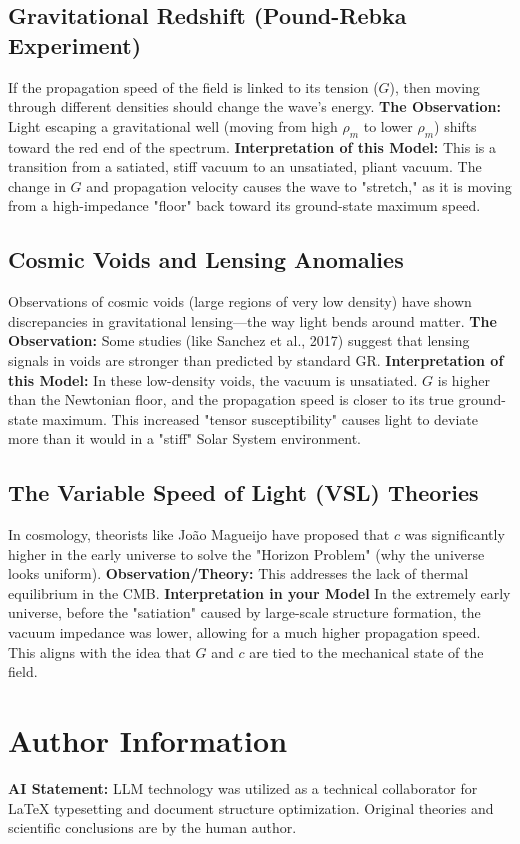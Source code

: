 \documentclass[12pt,a4paper]{article}
\begin{document}
\subsection{ Gravitational Redshift (Pound-Rebka Experiment)}
If the propagation speed of the field is linked to its tension ($G$), then moving through different densities should change the wave's energy.
\textbf{The Observation:} Light escaping a gravitational well (moving from high $\rho_m$ to lower $\rho_m$) shifts toward the red end of the spectrum.
\textbf{Interpretation of this Model:} This is a transition from a satiated, stiff vacuum to an unsatiated, pliant vacuum. The change in $G$ and propagation velocity causes the wave to "stretch," as it is moving from a high-impedance "floor" back toward its ground-state maximum speed.
\subsection{Cosmic Voids and Lensing Anomalies}
Observations of cosmic voids (large regions of very low density) have shown discrepancies in gravitational lensing—the way light bends around matter.
\textbf{The Observation:} Some studies (like Sanchez et al., 2017) suggest that lensing signals in voids are stronger than predicted by standard GR.
\textbf{Interpretation of this Model:} In these low-density voids, the vacuum is unsatiated. $G$ is higher than the Newtonian floor, and the propagation speed is closer to its true ground-state maximum. This increased "tensor susceptibility" causes light to deviate more than it would in a "stiff" Solar System environment.
\subsection{The Variable Speed of Light (VSL) Theories}
In cosmology, theorists like João Magueijo have proposed that $c$ was significantly higher in the early universe to solve the "Horizon Problem" (why the universe looks uniform).
\textbf{Observation/Theory:} This addresses the lack of thermal equilibrium in the CMB.
\textbf{Interpretation in your Model} In the extremely early universe, before the "satiation" caused by large-scale structure formation, the vacuum impedance was lower, allowing for a much higher propagation speed. This aligns with the idea that $G$ and $c$ are tied to the mechanical state of the field.

\section*{Author Information}
\noindent \textbf{AI Statement:} LLM technology was utilized as a technical collaborator for LaTeX typesetting and document structure optimization. Original theories and scientific conclusions are by the human author.
\end{document}
